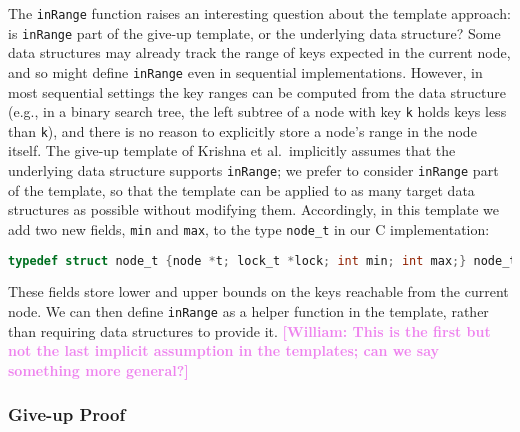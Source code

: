 \documentclass[a4paper,UKenglish,cleveref, autoref, thm-restate]{lipics-v2021}
\newcommand{\wm}[1]{\textbf{\textcolor{violet}{[William: #1]}}}
\begin{document}
The \lstinline{inRange} function raises an interesting question about the template approach: is \lstinline{inRange} part of the give-up template, or the underlying data structure? Some data structures may already track the range of keys expected in the current node, and so might define \lstinline{inRange} even in sequential implementations. However, in most sequential settings the key ranges can be computed from the data structure (e.g., in a binary search tree, the left subtree of a node with key \lstinline{k} holds keys less than \lstinline{k}), and there is no reason to explicitly store a node's range in the node itself. The give-up template of Krishna et al.~implicitly assumes that the underlying data structure supports \lstinline{inRange}; we prefer to consider \lstinline{inRange} part of the template, so that the template can be applied to as many target data structures as possible without modifying them. Accordingly, in this template we add two new fields, \lstinline{min} and \lstinline{max}, to the type \lstinline{node_t} in our C implementation:
\begin{lstlisting}[language = C, backgroundcolor=\color{white}, basicstyle=\ttfamily\footnotesize]
	typedef struct node_t {node *t; lock_t *lock; int min; int max;} node_t;
\end{lstlisting}
These fields store lower and upper bounds on the keys reachable from the current node. %
We can then define \texttt{inRange} as a helper function in the template, rather than requiring data structures to provide it. \wm{This is the first but not the last implicit assumption in the templates; can we say something more general?}

\subsubsection{Give-up Proof}
\label{traverse_proof_giveup}
\end{document}
